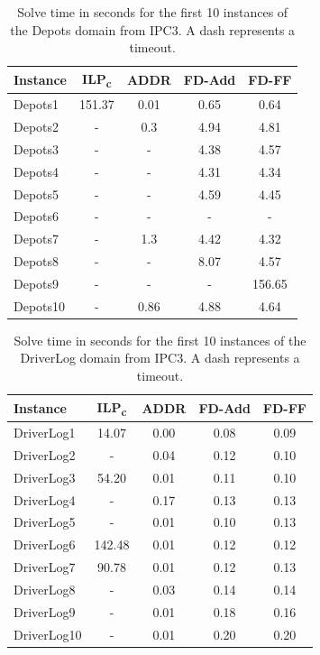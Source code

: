 \begin{table}[p]
    \centering
    \begin{tabular}{lcccc}
        \hline
        \textbf{Instance} & \textbf{ILP\textsubscript{c}} & \textbf{ADDR} & \textbf{FD-Add} & \textbf{FD-FF} \\ 
        \hline
        Depots1 & 151.37 & 0.01 & 0.65 & 0.64\\ 
        Depots2 & - & 0.3 & 4.94 & 4.81\\ 
        Depots3 & - & - & 4.38 & 4.57\\ 
        Depots4 & - & - & 4.31 & 4.34\\ 
        Depots5 & - & - & 4.59 & 4.45\\ 
        Depots6 & - & - & - & -\\ 
        Depots7 & - & 1.3 & 4.42 & 4.32\\ 
        Depots8 & - & - & 8.07 & 4.57\\ 
        Depots9 & - & - & - & 156.65\\ 
        Depots10 & - & 0.86 & 4.88 & 4.64\\ 
        \hline
    \end{tabular}
    \caption{Solve time in seconds for the first 10 instances of the Depots domain from IPC3. A dash represents a timeout.}
    \label{fig:depotsTime}
\end{table}


\begin{table}[p]
    \centering
    \begin{tabular}{lcccc}
        \hline
        \textbf{Instance} & \textbf{ILP\textsubscript{c}} & \textbf{ADDR} & \textbf{FD-Add} & \textbf{FD-FF} \\ 
        \hline
        DriverLog1 & 14.07 & 0.00 & 0.08 & 0.09\\ 
        DriverLog2 & - & 0.04 & 0.12 & 0.10\\ 
        DriverLog3 & 54.20 & 0.01 & 0.11 & 0.10\\ 
        DriverLog4 & - & 0.17 & 0.13 & 0.13\\ 
        DriverLog5 & - & 0.01 & 0.10 & 0.13\\ 
        DriverLog6 & 142.48 & 0.01 & 0.12 & 0.12\\ 
        DriverLog7 & 90.78 & 0.01 & 0.12 & 0.13\\ 
        DriverLog8 & - & 0.03 & 0.14 & 0.14\\ 
        DriverLog9 & - & 0.01 & 0.18 & 0.16\\ 
        DriverLog10 & - & 0.01 & 0.20 & 0.20\\
        \hline
    \end{tabular}
    \caption{Solve time in seconds for the first 10 instances of the DriverLog domain from IPC3. A dash represents a timeout.}
    \label{fig:driverLogTime}
\end{table}


